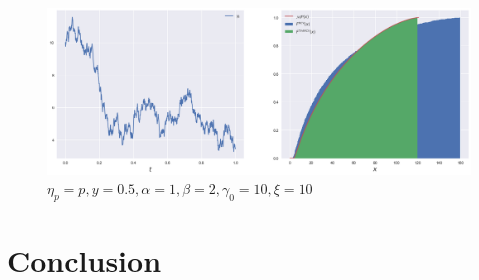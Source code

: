 \documentclass[a4paper,11pt]{article}
\theoremstyle{plain}
\theoremstyle{definition}
\begin{document}
    \begin{figure}
    	\begin{center} \centering
    		\includegraphics[scale=0.4]{XCIR}
    		\caption{$\eta_p = p, y = 0.5, \alpha = 1, \beta = 2, \gamma_0 = 10, \xi = 10$}
    	\end{center}
    \end{figure}
    
    
    \pagebreak
    \part{Conclusion}
    
\end{document}
